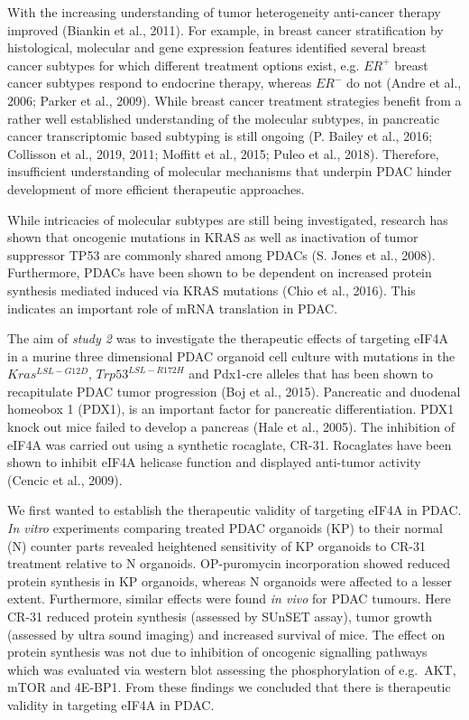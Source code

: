 \documentclass[12pt,openany]{book}
\begin{document}
With the increasing understanding of tumor heterogeneity anti-cancer
therapy improved (Biankin et al., 2011). For example, in breast cancer
stratification by histological, molecular and gene expression features
identified several breast cancer subtypes for which different treatment
options exist, e.g. \(ER^+\) breast cancer subtypes respond to endocrine
therapy, whereas \(ER^-\) do not (Andre et al., 2006; Parker et al.,
2009). While breast cancer treatment strategies benefit from a rather
well established understanding of the molecular subtypes, in pancreatic
cancer transcriptomic based subtyping is still ongoing (P. Bailey et
al., 2016; Collisson et al., 2019, 2011; Moffitt et al., 2015; Puleo et
al., 2018). Therefore, insufficient understanding of molecular
mechanisms that underpin PDAC hinder development of more efficient
therapeutic approaches.

While intricacies of molecular subtypes are still being investigated,
research has shown that oncogenic mutations in KRAS as well as
inactivation of tumor suppressor TP53 are commonly shared among PDACs
(S. Jones et al., 2008). Furthermore, PDACs have been shown to be
dependent on increased protein synthesis mediated induced via KRAS
mutations (Chio et al., 2016). This indicates an important role of mRNA
translation in PDAC.

The aim of \emph{study 2} was to investigate the therapeutic effects of
targeting eIF4A in a murine three dimensional PDAC organoid cell culture
with mutations in the \(Kras^{LSL-G12D}\), \(Trp53^{LSL-R172H}\) and
Pdx1-cre alleles that has been shown to recapitulate PDAC tumor
progression (Boj et al., 2015). Pancreatic and duodenal homeobox 1
(PDX1), is an important factor for pancreatic differentiation. PDX1
knock out mice failed to develop a pancreas (Hale et al., 2005). The
inhibition of eIF4A was carried out using a synthetic rocaglate, CR-31.
Rocaglates have been shown to inhibit eIF4A helicase function and
displayed anti-tumor activity (Cencic et al., 2009).

We first wanted to establish the therapeutic validity of targeting eIF4A
in PDAC. \emph{In vitro} experiments comparing treated PDAC organoids
(KP) to their normal (N) counter parts revealed heightened sensitivity
of KP organoids to CR-31 treatment relative to N organoids. OP-puromycin
incorporation showed reduced protein synthesis in KP organoids, whereas
N organoids were affected to a lesser extent. Furthermore, similar
effects were found \emph{in vivo} for PDAC tumours. Here CR-31 reduced
protein synthesis (assessed by SUnSET assay), tumor growth (assessed by
ultra sound imaging) and increased survival of mice. The effect on
protein synthesis was not due to inhibition of oncogenic signalling
pathways which was evaluated via western blot assessing the
phosphorylation of e.g.~AKT, mTOR and 4E-BP1. From these findings we
concluded that there is therapeutic validity in targeting eIF4A in PDAC.
\end{document}

